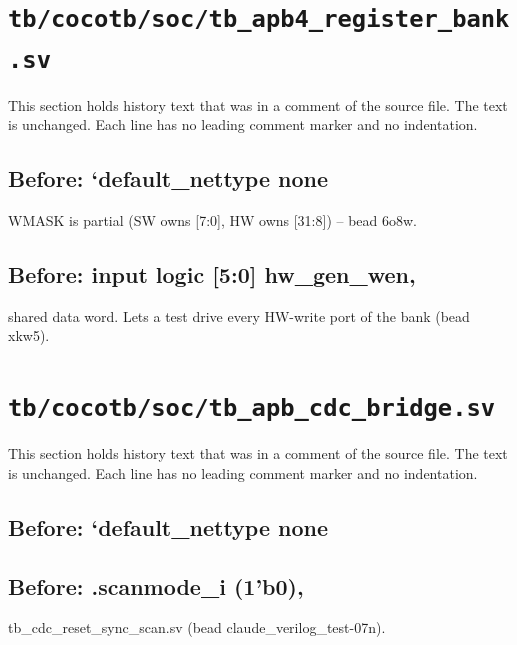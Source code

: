 \section{\texttt{tb/cocotb/soc/tb\_apb4\_register\_bank.sv}}\label{cr:suite:soc-tb-apb4-register-bank-sv}

This section holds history text that was in a comment of the source file. The text is unchanged. Each line has no leading comment marker and no indentation.

\begin{record}

\subsection*{Before: `default\_nettype none}

\begin{textblock}
WMASK is partial (SW owns [7:0], HW owns [31:8]) -- bead 6o8w.
\end{textblock}

\subsection*{Before: input  logic [5:0]        hw\_gen\_wen,}

\begin{textblock}
shared data word.  Lets a test drive every HW-write port of the bank (bead xkw5).
\end{textblock}

\end{record}

\section{\texttt{tb/cocotb/soc/tb\_apb\_cdc\_bridge.sv}}\label{cr:suite:soc-tb-apb-cdc-bridge-sv}

This section holds history text that was in a comment of the source file. The text is unchanged. Each line has no leading comment marker and no indentation.

\begin{record}

\subsection*{Before: `default\_nettype none}


\subsection*{Before: .scanmode\_i  (1'b0),}

\begin{textblock}
tb_cdc_reset_sync_scan.sv (bead claude_verilog_test-07n).
\end{textblock}

\end{record}

